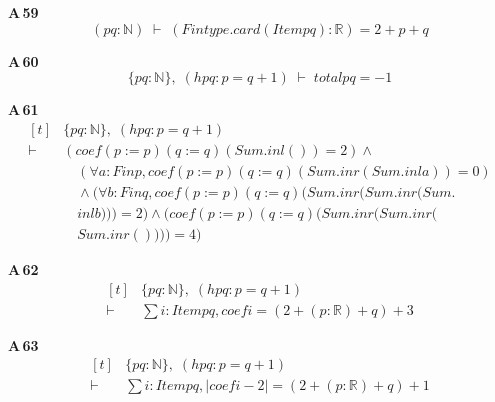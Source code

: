 \noindent\textbf{A\,59}\quad{}
{\footnotesize\[ (\mathit{p} \mathit{q} : \mathbb{N} ) \;\vdash\; (\mathit{Fintype}.\mathit{card} (\mathit{Item} \mathit{p} \mathit{q}) : \mathbb{R} ) = 2 + \mathit{p} + \mathit{q} \]}

\noindent\textbf{A\,60}\quad{}
{\footnotesize\[ \{ \mathit{p} \mathit{q} : \mathbb{N} \},\; (\mathit{hpq} : \mathit{p} = \mathit{q} + 1) \;\vdash\; \mathit{total} \mathit{p} \mathit{q} = -1 \]}

\noindent\textbf{A\,61}\quad{}
{\footnotesize\[ \begin{aligned}[t]
&\{ \mathit{p} \mathit{q} : \mathbb{N} \},\; (\mathit{hpq} : \mathit{p} = \mathit{q} + 1)\\
\vdash\;&(\mathit{coef} (\mathit{p} := \mathit{p}) (\mathit{q} := \mathit{q}) (\mathit{Sum}.\mathit{inl} ()) = 2) \wedge\\
&\quad (\forall \mathit{a} : \mathit{Fin} \mathit{p}, \mathit{coef} (\mathit{p} := \mathit{p}) (\mathit{q} := \mathit{q}) (\mathit{Sum}.\mathit{inr} (\mathit{Sum}.\mathit{inl} \mathit{a})) = 0)\\
&\quad \wedge (\forall \mathit{b} : \mathit{Fin} \mathit{q}, \mathit{coef} (\mathit{p} := \mathit{p}) (\mathit{q} := \mathit{q}) (\mathit{Sum}.\mathit{inr} (\mathit{Sum}.\mathit{inr} (\mathit{Sum}.\\
&\quad \mathit{inl} \mathit{b}))) = 2) \wedge (\mathit{coef} (\mathit{p} := \mathit{p}) (\mathit{q} := \mathit{q}) (\mathit{Sum}.\mathit{inr} (\mathit{Sum}.\mathit{inr} (\\
&\quad \mathit{Sum}.\mathit{inr} ()))) = 4)
\end{aligned} \]}

\noindent\textbf{A\,62}\quad{}
{\footnotesize\[ \begin{aligned}[t]
&\{ \mathit{p} \mathit{q} : \mathbb{N} \},\; (\mathit{hpq} : \mathit{p} = \mathit{q} + 1)\\
\vdash\;&\textstyle\sum \mathit{i} : \mathit{Item} \mathit{p} \mathit{q}, \mathit{coef} \mathit{i} = (2 + (\mathit{p} : \mathbb{R} ) + \mathit{q}) + 3
\end{aligned} \]}

\noindent\textbf{A\,63}\quad{}
{\footnotesize\[ \begin{aligned}[t]
&\{ \mathit{p} \mathit{q} : \mathbb{N} \},\; (\mathit{hpq} : \mathit{p} = \mathit{q} + 1)\\
\vdash\;&\textstyle\sum \mathit{i} : \mathit{Item} \mathit{p} \mathit{q}, |\mathit{coef} \mathit{i} - 2| = (2 + (\mathit{p} : \mathbb{R} ) + \mathit{q}) + 1
\end{aligned} \]}

